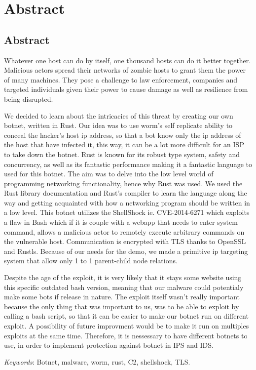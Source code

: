 \documentclass[../main.tex]{subfiles}
\begin{document}
    \newpage

	\chapter*{Abstract}

    \section*{Abstract}

    Whatever one host can do by itself, one thousand hosts can do it better together. 
    Malicious actors spread their networks of zombie hosts to grant them the power of many machines.
    They pose a challenge to law enforcement, companies and targeted individuals given their power to cause damage as well as resilience from being disrupted.

    We decided to learn about the intricacies of this threat by creating our own botnet, written in Rust. 
    Our idea was to use worm's self replicate ability to conceal the hacker's host ip address, so that a bot know only the ip address of the host that have infected it, this way, it can be a lot more difficult for an ISP to take down the botnet.
    Rust is known for its robust type system, safety and concurrency, as well as its fantastic performance making it a fantastic language to used for this botnet.
    The aim was to delve into the low level world of programming networking functionality, hence why Rust was used. 
    We used the Rust library documentation and Rust's compiler to learn the language along the way and getting acquainted with how a networking program should be written in a low level.
    This botnet utilizes the ShellShock ie. CVE-2014-6271 which exploits a flaw in Bash which if it is couple with a webapp that needs to enter system command, allows a malicious actor to remotely execute arbitrary commands on the vulnerable host.
    Communication is encrypted with TLS thanks to OpenSSL and Rustls. 
    Because of our needs for the demo, we made a primitive ip targeting system that allow only 1 to 1 parent-child node relations.

    Despite the age of the exploit, it is very likely that it stays some website using this specific outdated bash version, meaning that our malware could potentialy make some bots if release in nature. 
    The exploit itself wasn't really important because the only thing that was important to us, was to be able to exploit by calling a bash script, so that it can be easier to make our botnet run on different exploit. 
    A possibility of future improvment would be to make it run on multiples exploits at the same time.
    Therefore, it is nessessary to have different botnets to use, in order to implement protection against botnet in IPS and IDS.


	\vspace{10pt}

	\qquad \textit{Keywords}: Botnet, malware, worm, rust, C2, shellshock, TLS.
\end{document}
